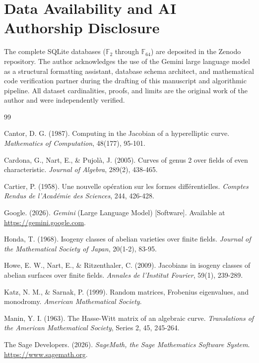 \documentclass[letterpaper, 11pt]{article}
\begin{document}
\section{Data Availability and AI Authorship Disclosure}
The complete SQLite databases ($\mathbb{F}_{2}$ through $\mathbb{F}_{64}$) are deposited in the Zenodo repository. The author acknowledges the use of the Gemini large language model \cite{Gemini2026} as a structural formatting assistant, database schema architect, and mathematical code verification partner during the drafting of this manuscript and algorithmic pipeline. All dataset cardinalities, proofs, and limits are the original work of the author and were independently verified.

\begin{thebibliography}{99}

Cantor, D. G. (1987). Computing in the Jacobian of a hyperelliptic curve. \textit{Mathematics of Computation}, 48(177), 95-101.

Cardona, G., Nart, E., \& Pujolà, J. (2005). Curves of genus 2 over fields of even characteristic. \textit{Journal of Algebra}, 289(2), 438-465.

Cartier, P. (1958). Une nouvelle op\'{e}ration sur les formes diff\'{e}rentielles. \textit{Comptes Rendus de l'Acad\'{e}mie des Sciences}, 244, 426-428.

Google. (2026). \textit{Gemini} (Large Language Model) [Software]. Available at \url{https://gemini.google.com}.

Honda, T. (1968). Isogeny classes of abelian varieties over finite fields. \textit{Journal of the Mathematical Society of Japan}, 20(1-2), 83-95.

Howe, E. W., Nart, E., \& Ritzenthaler, C. (2009). Jacobians in isogeny classes of abelian surfaces over finite fields. \textit{Annales de l'Institut Fourier}, 59(1), 239-289.

Katz, N. M., \& Sarnak, P. (1999). Random matrices, Frobenius eigenvalues, and monodromy. \textit{American Mathematical Society}.

Manin, Y. I. (1963). The Hasse-Witt matrix of an algebraic curve. \textit{Translations of the American Mathematical Society}, Series 2, 45, 245-264.

The Sage Developers. (2026). \textit{SageMath, the Sage Mathematics Software System}. \url{https://www.sagemath.org}.


\end{thebibliography}
\end{document}
